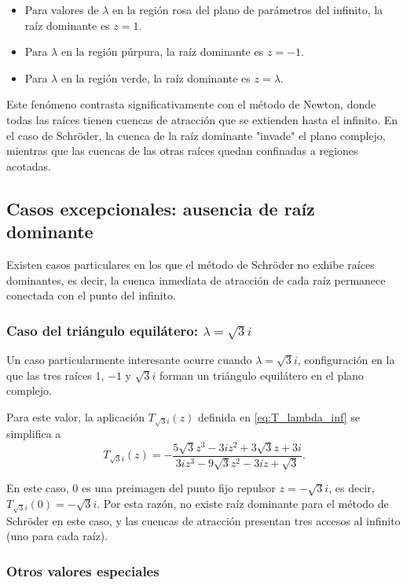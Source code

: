 \begin{itemize}
\item Para valores de $\lambda$ en la región rosa del plano de parámetros del infinito, la raíz dominante es $z=1$.
\item Para $\lambda$ en la región púrpura, la raíz dominante es $z=-1$.
\item Para $\lambda$ en la región verde, la raíz dominante es $z=\lambda$.
\end{itemize}

Este fenómeno contrasta significativamente con el método de Newton, donde todas las raíces tienen cuencas de atracción que se extienden hasta el infinito. En el caso de Schröder, la cuenca de la raíz dominante "invade" el plano complejo, mientras que las cuencas de las otras raíces quedan confinadas a regiones acotadas.

\subsection{Casos excepcionales: ausencia de raíz dominante}

Existen casos particulares en los que el método de Schröder no exhibe raíces dominantes, es decir, la cuenca inmediata de atracción de cada raíz permanece conectada con el punto del infinito.

\subsubsection{Caso del triángulo equilátero: $\lambda=\sqrt{3}i$}

Un caso particularmente interesante ocurre cuando $\lambda=\sqrt{3}i$, configuración en la que las tres raíces $1$, $-1$ y $\sqrt{3}i$ forman un triángulo equilátero en el plano complejo.

Para este valor, la aplicación $T_{\sqrt{3}i}(z)$ definida en \eqref{eq:T_lambda_inf} se simplifica a
$$
T_{\sqrt{3}i}(z)=-\frac{5\sqrt{3}z^3-3iz^2+3\sqrt{3}z+3i}{3iz^3-9\sqrt{3}z^2-3iz+\sqrt{3}}.
$$

En este caso, $0$ es una preimagen del punto fijo repulsor $z=-\sqrt{3}i$, es decir, $T_{\sqrt{3}i}(0)=-\sqrt{3}i$. Por esta razón, no existe raíz dominante para el método de Schröder en este caso, y las cuencas de atracción presentan tres accesos al infinito (uno para cada raíz).

\subsubsection{Otros valores especiales}

